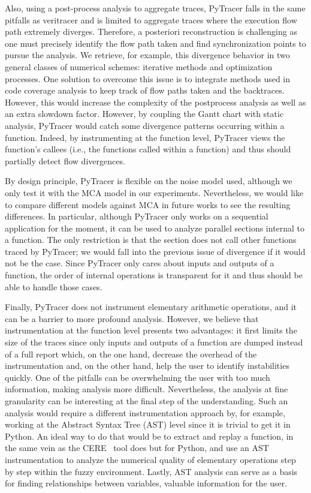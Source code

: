 \documentclass[11pt]{article}
\newcommand{\pytracer}[0]{PyTracer\xspace}
\begin{document}
Also, using a post-process analysis to aggregate traces, \pytracer falls in the same pitfalls as veritracer and is limited to aggregate traces where the execution flow path extremely diverges. Therefore, a posteriori reconstruction
is challenging as one must precisely identify the flow path taken and find synchronization points to pursue the analysis. We retrieve, for example, this divergence behavior in two general classes of numerical schemes: iterative methods and optimization processes. One solution to overcome this issue is to integrate methods used in code coverage analysis to keep track of flow paths taken and the backtraces.
However, this would increase the complexity of the postprocess analysis as well as an extra slowdown factor.
However, by coupling the Gantt chart with static analysis, \pytracer would catch some divergence patterns occurring within a function. Indeed, by instrumenting at the function level, \pytracer views the function's callees (i.e., the functions called within a function) and thus should partially detect flow divergences.

By design principle, \pytracer is flexible on the noise model used, although we only test it with the MCA model in our experiments.
Nevertheless, we would like to compare different models against MCA in future works to see the resulting differences. 
In particular, although \pytracer only works on a sequential application for the moment, it can be used to analyze parallel sections internal to a function.
The only restriction is that the section does not call other functions traced by \pytracer; we would fall into the previous issue of divergence if it would not be the case.
Since \pytracer only cares about inputs and outputs of a function, the order of internal operations is transparent for it and thus should be able to handle those cases.

Finally, \pytracer does not instrument elementary arithmetic operations, and it can be a barrier to more profound analysis.
However, we believe that instrumentation at the function level presents two advantages: it first limits the size of the traces since only inputs and outputs of a function are dumped instead of a full report which, on the one hand, decrease the overhead of the instrumentation and, on the other hand, help the user to identify instabilities quickly. One of the pitfalls can be overwhelming the user with too much information, making analysis more difficult. Nevertheless, the analysis at fine granularity can be interesting at the final step of the understanding. Such an analysis would require a different instrumentation approach by, for example, working at the Abstract Syntax Tree (AST) level since it is trivial to get it in Python.
An ideal way to do that would be to extract and replay a function, in the same vein as the CERE~\cite{castro2015cere} tool does but for Python, and use an AST instrumentation to analyze the numerical quality of elementary operations step by step within the fuzzy environment.
Lastly, AST analysis can serve as a basis for finding relationships between variables, valuable information for the user.
\end{document}

